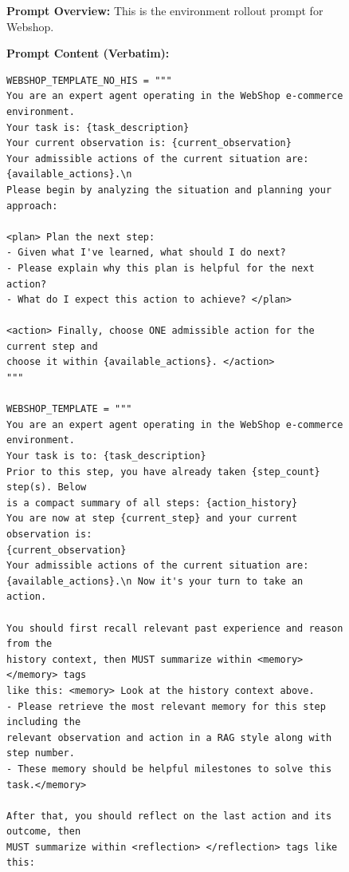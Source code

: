 \begin{figure}[htbp]
\centering
\begin{tcolorbox}[
    title=\textbf{Environment Rollout Prompt - Webshop },
    colback=orange!1!white,
    colframe=orange!50!black,
    fonttitle=\bfseries,
]
\small

\textbf{Prompt Overview:}  
This is the environment rollout prompt for Webshop.

\vspace{2mm}

\textbf{Prompt Content (Verbatim):}
\begin{verbatim}
WEBSHOP_TEMPLATE_NO_HIS = """
You are an expert agent operating in the WebShop e-commerce environment.
Your task is: {task_description}
Your current observation is: {current_observation}
Your admissible actions of the current situation are: 
{available_actions}.\n
Please begin by analyzing the situation and planning your approach:

<plan> Plan the next step:
- Given what I've learned, what should I do next?
- Please explain why this plan is helpful for the next action?
- What do I expect this action to achieve? </plan>

<action> Finally, choose ONE admissible action for the current step and 
choose it within {available_actions}. </action>
"""

WEBSHOP_TEMPLATE = """
You are an expert agent operating in the WebShop e-commerce environment.
Your task is to: {task_description}
Prior to this step, you have already taken {step_count} step(s). Below 
is a compact summary of all steps: {action_history}
You are now at step {current_step} and your current observation is: 
{current_observation}
Your admissible actions of the current situation are: 
{available_actions}.\n Now it's your turn to take an action.

You should first recall relevant past experience and reason from the 
history context, then MUST summarize within <memory> </memory> tags 
like this: <memory> Look at the history context above.
- Please retrieve the most relevant memory for this step including the 
relevant observation and action in a RAG style along with step number.
- These memory should be helpful milestones to solve this task.</memory>

After that, you should reflect on the last action and its outcome, then 
MUST summarize within <reflection> </reflection> tags like this:


\end{verbatim}
\end{tcolorbox}
\end{figure}
